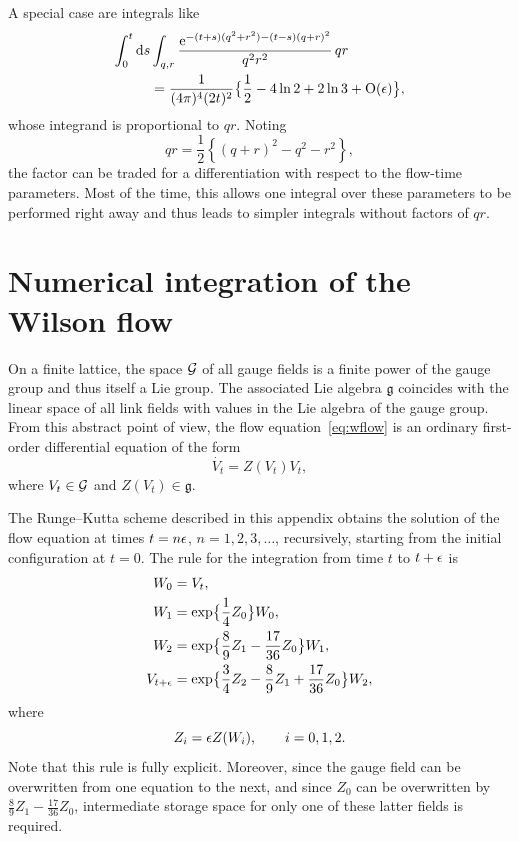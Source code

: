 A special case are integrals like
\begin{equation}
\begin{split}
  \int_0^t\mathrm{d} s&\int_{q,r}
  {\mathrm{e}^{-(t+s)(q^2+r^2)-(t-s)(q+r)^2}\over q^2r^2}\,
  qr\\
  &={1\over(4\pi)^4(2t)^2}\bigl\{\frac{1}{2}-4\ln2+2\ln3+\mathrm{O}(\epsilon)\bigr\},
\end{split}
\end{equation}
whose integrand is proportional to $qr$. Noting
\begin{equation}
  qr=\frac{1}{2}\left\{(q+r)^2-q^2-r^2\right\},
\end{equation}
the factor can be traded for a differentiation with respect to the
flow-time parameters. Most of the time, this allows one integral over
these parameters to be performed right away and thus leads to
simpler integrals without factors of $qr$.


\section{Numerical integration of the Wilson flow}\label{app:C}

On a finite lattice, the space ${\cal G}$ of all gauge fields
is a finite power of the gauge group and thus itself a Lie group.
The associated Lie algebra $\mathfrak{g}$ coincides with the linear
space of all link fields
with values in the Lie algebra of the gauge group. From this
abstract point of view,
the flow equation~\eqref{eq:wflow} is an ordinary first-order differential
equation of the form
\begin{equation}
   \dot{V_t}=Z(V_t)V_t,
   \label{eq:flowODE}
\end{equation}
where $V_t\in{\cal G}$ and $Z(V_t)\in\mathfrak{g}$.

The Runge--Kutta scheme
described in this appendix
obtains the solution of the flow equation at
times $t=n\epsilon$, $n=1,2,3,\ldots$, recursively,
starting from the initial configuration at $t=0$.
The rule for the integration
from time $t$ to $t+\epsilon$ is
\begin{align}
  W_0&=V_t,
  \nonumber\\
  W_1&=\exp\bigl\{\frac{1}{4}Z_0\bigr\}W_0,
  \nonumber\\
  W_2&=\exp\bigl\{\frac{8}{9}Z_1-\frac{17}{36}Z_0\bigr\}W_1,
  \nonumber\\
  V_{t+\epsilon}&=\exp\bigl\{\frac{3}{4}Z_2
                        -\frac{8}{9}Z_1+\frac{17}{36}Z_0\bigr\}W_2,
  \label{eq:RKstep}
\end{align}
where
\begin{equation}
  Z_i=\epsilon Z(W_i),\qquad i=0,1,2.
\end{equation}
Note that this rule is fully explicit.
Moreover, since the gauge field can be overwritten from one
equation to the next, and
since $Z_0$ can be overwritten by
$\frac{8}{9}Z_1-\frac{17}{36}Z_0$, intermediate
storage space for only one of these latter
fields is required.

